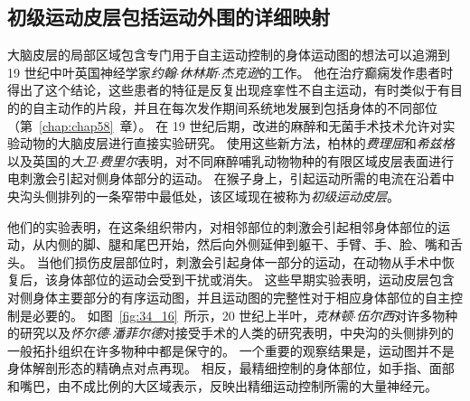\subsection{初级运动皮层包括运动外围的详细映射}

大脑皮层的局部区域包含专门用于自主运动控制的身体运动图的想法可以追溯到 19 世纪中叶英国神经学家\textit{约翰$\cdot$休林斯$\cdot$杰克逊}的工作。
他在治疗癫痫发作患者时得出了这个结论，这些患者的特征是反复出现痉挛性不自主运动，有时类似于有目的的自主动作的片段，并且在每次发作期间系统地发展到包括身体的不同部位（第~\ref{chap:chap58}~章）。
在 19 世纪后期，改进的麻醉和无菌手术技术允许对实验动物的大脑皮层进行直接实验研究。
使用这些新方法，柏林的\textit{费理屈}和\textit{希兹格}以及英国的\textit{大卫$\cdot$费里尔}表明，对不同麻醉哺乳动物物种的有限区域皮层表面进行电刺激会引起对侧身体部分的运动。
在猴子身上，引起运动所需的电流在沿着中央沟头侧排列的一条窄带中最低处，该区域现在被称为\textit{初级运动皮层}。


他们的实验表明，在这条组织带内，对相邻部位的刺激会引起相邻身体部位的运动，从内侧的脚、腿和尾巴开始，然后向外侧延伸到躯干、手臂、手、脸、嘴和舌头。
当他们损伤皮层部位时，刺激会引起身体一部分的运动，在动物从手术中恢复后，该身体部位的运动会受到干扰或消失。
这些早期实验表明，运动皮层包含对侧身体主要部分的有序运动图，并且运动图的完整性对于相应身体部位的自主控制是必要的。
如图~\ref{fig:34_16}~所示，20 世纪上半叶，\textit{克林顿$\cdot$伍尔西}对许多物种的研究以及\textit{怀尔德$\cdot$潘菲尔德}对接受手术的人类的研究表明，中央沟的头侧排列的一般拓扑组织在许多物种中都是保守的。
一个重要的观察结果是，运动图并不是身体解剖形态的精确点对点再现。
相反，最精细控制的身体部位，如手指、面部和嘴巴，由不成比例的大区域表示，反映出精细运动控制所需的大量神经元。


